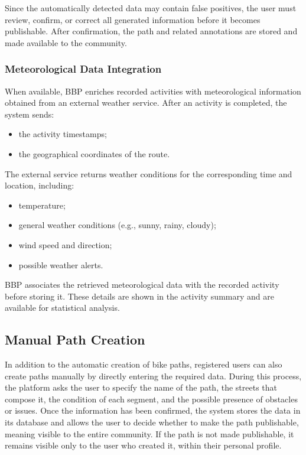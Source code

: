 Since the automatically detected data may contain false positives, the user must review, confirm, or correct all generated information before it becomes publishable. After confirmation, the path and related annotations are stored and made available to the community.


\subsubsection*{Meteorological Data Integration}
When available, BBP enriches recorded activities with meteorological information obtained from an external weather service. After an activity is completed, the system sends:
\begin{itemize}
    \item the activity timestamps;
    \item the geographical coordinates of the route.
\end{itemize}

The external service returns weather conditions for the corresponding time and location, including:
\begin{itemize}
    \item temperature;
    \item general weather conditions (e.g., sunny, rainy, cloudy);
    \item wind speed and direction;
    \item possible weather alerts.
\end{itemize}

BBP associates the retrieved meteorological data with the recorded activity before storing it. These details are shown in the activity summary and are available for statistical analysis.










\subsection*{Manual Path Creation}
In addition to the automatic creation of bike paths, registered users can also create paths manually by directly entering the required data.
During this process, the platform asks the user to specify the name of the path, the streets that compose it, the condition of each segment, and the possible presence of obstacles or issues.
Once the information has been confirmed, the system stores the data in its database and allows the user to decide whether to make the path publishable, meaning visible to the entire community.
If the path is not made publishable, it remains visible only to the user who created it, within their personal profile.

